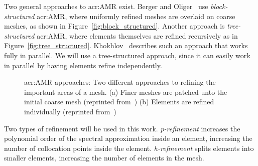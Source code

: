 Two general approaches to \acrshort{acr:AMR} exist. Berger and Oliger~\cite{Berger1984} use
\textit{block-structured} \acrshort{acr:AMR}, where uniformly refined meshes are overlaid on coarse
meshes, as shown in Figure~\ref{fig:block_structured}. Another approach is \textit{tree-structured}
\acrshort{acr:AMR}, where elements themselves are refined recursively as in
Figure~\ref{fig:tree_structured}. Khokhlov~\cite{Khokhlov1998} describes such an approach that works
fully in parallel. We will use a tree-structured approach, since it can easily work in parallel by
having elements refine independently.

\begin{figure}[H]
	\centering
	\hfill
	\caption{\Acrlong{acr:AMR} approaches: Two different approaches to refining the important areas of a mesh. (a) Finer meshes are patched unto the initial coarse mesh (reprinted from~\cite{Berger1984}) (b) Elements are refined individually (reprinted from~\cite{Khokhlov1998})}\label{fig:amr_structures}
\end{figure}

Two types of refinement will be used in this work. \textit{p-refinement} increases the polynomial
order of the spectral approximation inside an element, increasing the number of collocation points
inside the element. \textit{h-refinement} splits elements into smaller elements, increasing the
number of elements in the mesh.

